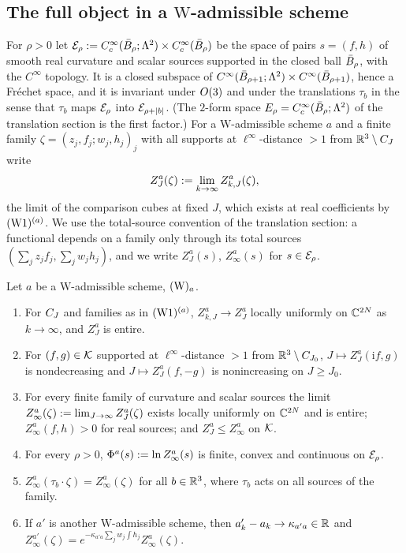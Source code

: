 \subsection{The full object in a $\mathrm W$-admissible scheme}

For $\rho>0$ let $\mathcal E_\rho:= C^\infty_c(\bar B_{\rho};\Lambda^2)\times C^\infty_c(\bar B_{\rho})$ be the space of pairs $s=(f,h)$ of smooth real curvature and scalar sources supported in the closed ball $\bar B_{\rho}$, with the $C^\infty$ topology. It is a closed subspace of $C^\infty(\bar B_{\rho+1};\Lambda^2)\times C^\infty(\bar B_{\rho+1})$, hence a Fr\'echet space, and it is invariant under $O(3)$ and under the translations $\tau_b$ in the sense that $\tau_b$ maps $\mathcal E_\rho$ into $\mathcal E_{\rho+|b|}$. (The $2$-form space $E_\rho=C^\infty_c(\bar B_{\rho};\Lambda^2)$ of the translation section is the first factor.) For a $\mathrm W$-admissible scheme $a$ and a finite family $\zeta=(z_j,f_j;w_j,h_j)_j$ with all supports at $\ell^\infty$-distance $>1$ from $\mathbb R^3\setminus C_J$ write
\[
Z^a_J(\zeta):=\lim_{k\to\infty}Z^a_{k,J}(\zeta),
\]
the limit of the comparison cubes at fixed $J$, which exists at real coefficients by $(\mathrm{W1})^{(a)}$. We use the total-source convention of the translation section: a functional depends on a family only through its total sources $(\sum_jz_jf_j,\sum_jw_jh_j)$, and we write $Z^a_J(s)$, $Z^a_\infty(s)$ for $s\in\mathcal E_\rho$.

\begin{theorem}\label{rot:thm:full}
Let $a$ be a $\mathrm W$-admissible scheme, $(\mathrm W)_{a}$.
\begin{enumerate}[label=\textup{(\roman*)},leftmargin=*]
\item For $C_J$ and families as in $(\mathrm{W1})^{(a)}$, $Z^a_{k,J}\to Z^a_J$ locally uniformly on $\mathbb C^{2N}$ as $k\to\infty$, and $Z^a_J$ is entire.
\item For $(f,g)\in\mathcal K$ supported at $\ell^\infty$-distance $>1$ from $\mathbb R^3\setminus C_{J_0}$, $J\mapsto Z^a_J(\mathrm if,g)$ is nondecreasing and $J\mapsto Z^a_J(f,-g)$ is nonincreasing on $J\ge J_0$.
\item For every finite family of curvature and scalar sources the limit $Z^a_\infty(\zeta):=\lim_{J\to\infty}Z^a_J(\zeta)$ exists locally uniformly on $\mathbb C^{2N}$ and is entire; $Z^a_\infty(f,h)>0$ for real sources; and $Z^a_J\le Z^a_\infty$ on $\mathcal K$.
\item For every $\rho>0$, $\Phi^a(s):=\ln Z^a_\infty(s)$ is finite, convex and continuous on $\mathcal E_\rho$.
\item $Z^a_\infty(\tau_b\cdot\zeta)=Z^a_\infty(\zeta)$ for all $b\in\mathbb R^3$, where $\tau_b$ acts on all sources of the family.
\item If $a'$ is another $\mathrm W$-admissible scheme, then $a'_k-a_k\to\kappa_{a'a}\in\mathbb R$ and $Z^{a'}_\infty(\zeta)=e^{-\kappa_{a'a}\sum_jw_j\int h_j}Z^a_\infty(\zeta)$.
\end{enumerate}
\end{theorem}

